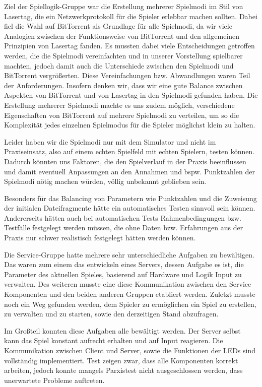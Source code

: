 Ziel der Spiellogik-Gruppe war die Erstellung mehrerer Spielmodi im Stil von 
Lasertag, die ein Netzwerkprotokoll für die Spieler erlebbar machen sollten. 
Dabei fiel die Wahl auf BitTorrent als Grundlage für alle Spielmodi, da wir viele 
Analogien zwischen der Funktionsweise von BitTorrent und den allgemeinen
Prinzipien von Lasertag fanden. Es mussten dabei viele Entscheidungen getroffen 
werden, die die Spielmodi vereinfachten und in unserer Vorstellung spielbarer
machten, jedoch damit auch die Unterschiede zwischen den Spielmodi und BitTorrent
vergrößerten. Diese Vereinfachungen bzw. Abwandlungen waren Teil der
Anforderungen. Insofern denken wir, dass wir eine gute Balance zwischen Aspekten 
von BitTorrent und von Lasertag in den Spielmodi gefunden haben. Die Erstellung
mehrerer Spielmodi machte es uns zudem möglich, verschiedene Eigenschaften von 
BitTorrent auf mehrere Spielmodi zu verteilen, um so die Komplexität jedes
einzelnen Spielmodus für die Spieler möglichst klein zu halten.

Leider haben wir die Spielmodi nur mit dem Simulator und nicht im Praxiseinsatz, 
also auf einem echten Spielfeld mit echten Spielern, testen können. Dadurch 
könnten uns Faktoren, die den Spielverlauf in der Praxis beeinflussen und damit
eventuell Anpassungen an den Annahmen und bspw. Punktzahlen der Spielmodi nötig 
machen würden, völlig unbekannt geblieben sein.

Besonders für das Balancing von Parametern wie Punktzahlen und die Zuweisung der
initialen Dateifragmente hätte ein automatisches Testen sinnvoll sein können.
Andererseits hätten auch bei automatischen Tests Rahmenbedingungen bzw. Testfälle 
festgelegt werden müssen, die ohne Daten bzw. Erfahrungen aus der Praxis nur schwer 
realistisch festgelegt hätten werden können.
\newline

Die Service-Gruppe hatte mehrere sehr unterschiedliche Aufgaben zu bewältigen. 
Das waren zum einem das entwickeln eines Servers, dessen Aufgabe es ist, die Parameter des aktuellen Spieles, 
basierend auf Hardware und Logik Input zu verwalten. Des weiteren musste eine diese Kommunikation zwischen den 
Service Komponenten und den beiden anderen Gruppen etabliert werden. Zuletzt musste noch ein Weg gefunden werden, 
dem Spieler zu ermöglichen ein Spiel zu erstellen, zu verwalten und zu starten, sowie den derzeitigen Stand abzufragen.

Im Großteil konnten diese Aufgaben alle bewältigt werden. Der Server selbst kann das Spiel konstant aufrecht erhalten 
und auf Input reagieren. Die Kommunikation zwischen Client und Server, sowie die Funktionen der LEDs sind vollständig implementiert. 
Test zeigen zwar, dass alle Komponenten korrekt arbeiten, jedoch konnte mangels Parxistest nicht ausgeschlossen werden, dass unerwartete Probleme auftreten.

